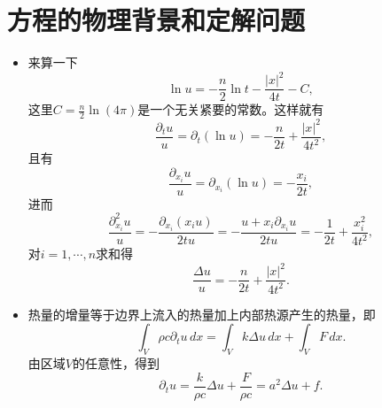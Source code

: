 \renewcommand\thesection{3.\arabic{section}}
\section{方程的物理背景和定解问题}
\begin{itemize}
\item[1.] 来算一下
\[\ln u=-\frac{n}{2}\ln t-\frac{|x|^2}{4t}-C,\]
这里$C=\frac{n}{2}\ln(4\pi)$是一个无关紧要的常数。这样就有
\[\frac{\partial_tu}{u}=\partial_t(\ln u)=-\frac{n}{2t}+\frac{|x|^2}{4t^2},\]
且有\[\frac{\partial_{x_i}u}{u}=\partial_{x_i}(\ln u)=-\frac{x_i}{2t},\]
进而
\[\frac{\partial_{x_i}^2u}{u}=-\frac{\partial_{x_i}(x_iu)}{2tu}
=-\frac{u+x_i\partial_{x_i}u}{2tu}=-\frac{1}{2t}+\frac{x_i^2}{4t^2},\]
对$i=1,\cdots,n$求和得
\[\frac{\Delta u}{u}=-\frac{n}{2t}+\frac{|x|^2}{4t^2}.\]

\item[2.] 热量的增量等于边界上流入的热量加上内部热源产生的热量，即
\[\int_V\rho c\partial_tu\,dx=\int_Vk\Delta u\,dx+\int_VF\,dx.\]
由区域$V$的任意性，得到
\[\partial_tu=\frac{k}{\rho c}\Delta u+\frac{F}{\rho c}=a^2\Delta u+f.\]
\end{itemize}

